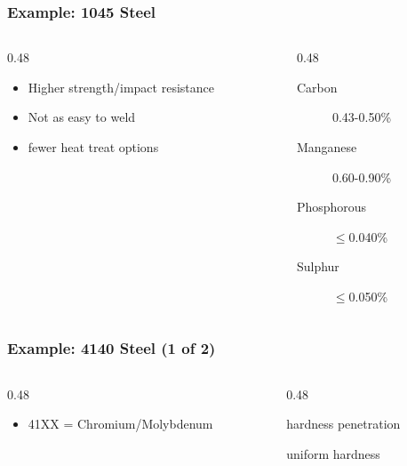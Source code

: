 \begin{frame}
	\frametitle{Example: 1045 Steel}

    \begin{columns}[t]
        \begin{column}{0.48\linewidth}
            \begin{itemize}[<+- | alert@+>]
                \item Higher strength/impact resistance
                \item Not as easy to weld
                \item fewer heat treat options
            \end{itemize}
        \end{column}
        \begin{column}{0.48\linewidth}
            \begin{description}
                \item[Carbon] 0.43-0.50\%
                \item[Manganese] 0.60-0.90\%
                \item[Phosphorous] $\leq$0.040\%
                \item[Sulphur] $\leq$0.050\%
            \end{description}
        \end{column}
    \end{columns}
\end{frame}

\begin{frame}
	\frametitle{Example: 4140 Steel (1 of 2)}

    \begin{columns}[t]
        \begin{column}{0.48\linewidth}
            \begin{itemize}[<+- | alert@+>]
                \item 41XX = Chromium/Molybdenum
            \end{itemize}
        \end{column}
        \begin{column}{0.48\linewidth}
            \begin{description}[<+- | alert@+>]
                \item[Chromium] hardness penetration
                \item[Molybdenum] uniform hardness
            \end{description}
        \end{column}
    \end{columns}
\end{frame}


